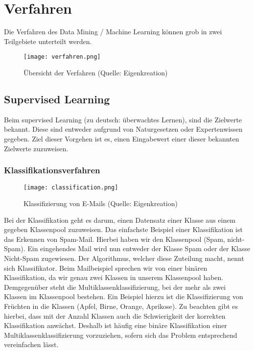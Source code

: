 \chapter{Verfahren}
Die Verfahren des Data Mining / Machine Learning können grob in zwei Teilgebiete unterteilt werden.\cite{pythonml}\cite{guru}

\begin{figure}[h!]
		\centering
		\texttt{[image: verfahren.png]}
		\caption{Übersicht der Verfahren (Quelle: Eigenkreation)}
\end{figure}

\section{Supervised Learning}
Beim supervised Learning (zu deutsch: überwachtes Lernen), sind die Zielwerte bekannt. Diese sind entweder aufgrund von Naturgesetzen oder Expertenwissen gegeben. Ziel dieser Vorgehen ist es, einen Eingabewert einer dieser bekannten Zielwerte zuzuweisen.

\subsection{Klassifikationsverfahren}
\begin{figure}[h!]
	\centering
	\texttt{[image: classification.png]}
	\caption{Klassifizierung von E-Mails (Quelle: Eigenkreation)}
\end{figure}
Bei der Klassifikation geht es darum, einen Datensatz einer Klasse aus einem gegeben Klassenpool zuzuweisen. Das einfachste Beispiel einer Klassifikation ist das Erkennen von Spam-Mail. Hierbei haben wir den Klassenpool (Spam, nicht-Spam). Ein eingehendes Mail wird nun entweder der Klasse Spam oder der Klasse Nicht-Spam zugewiesen. Der Algorithmus, welcher diese Zuteilung macht, nennt sich Klassifikator.
Beim Mailbeispiel sprechen wir von einer binären Klassifikation, da wir genau zwei Klassen in unserem Klassenpool haben. Demgegenüber steht die Multiklassenklassifizierung, bei der mehr als zwei Klassen im Klassenpool bestehen. Ein Beispiel hierzu ist die Klassifizierung von Früchten in die Klassen (Apfel, Birne, Orange, Aprikose).
Zu beachten gibt es hierbei, dass mit der Anzahl Klassen auch die Schwierigkeit der korrekten Klassifikation anwächst. Deshalb ist häufig eine binäre Klassifikation einer Multiklassenklassifizierung vorzuziehen, sofern sich das Problem entsprechend vereinfachen lässt.


